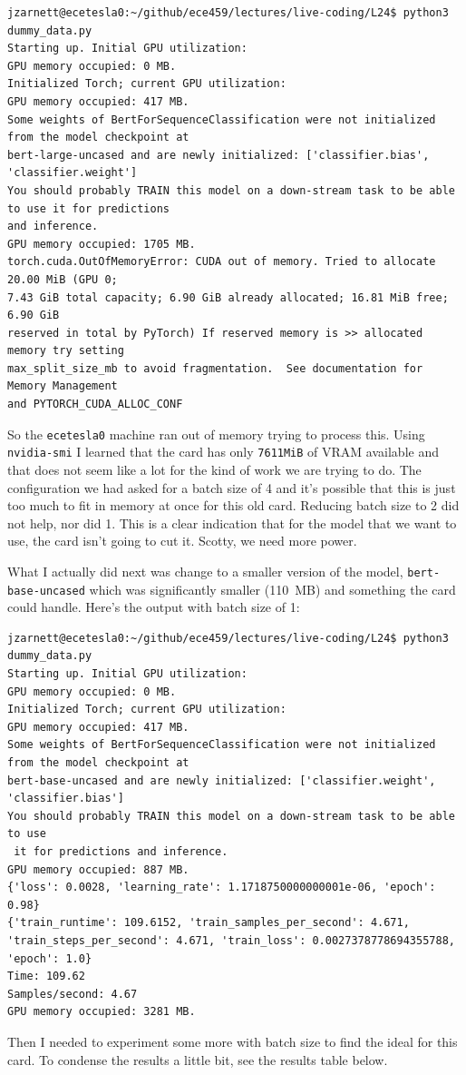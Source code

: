 \documentclass[a4paper]{report}
\begin{document}
{\small
\begin{verbatim}
jzarnett@ecetesla0:~/github/ece459/lectures/live-coding/L24$ python3 dummy_data.py 
Starting up. Initial GPU utilization:
GPU memory occupied: 0 MB.
Initialized Torch; current GPU utilization:
GPU memory occupied: 417 MB.
Some weights of BertForSequenceClassification were not initialized from the model checkpoint at 
bert-large-uncased and are newly initialized: ['classifier.bias', 'classifier.weight']
You should probably TRAIN this model on a down-stream task to be able to use it for predictions 
and inference.
GPU memory occupied: 1705 MB.
torch.cuda.OutOfMemoryError: CUDA out of memory. Tried to allocate 20.00 MiB (GPU 0; 
7.43 GiB total capacity; 6.90 GiB already allocated; 16.81 MiB free; 6.90 GiB 
reserved in total by PyTorch) If reserved memory is >> allocated memory try setting 
max_split_size_mb to avoid fragmentation.  See documentation for Memory Management
and PYTORCH_CUDA_ALLOC_CONF
\end{verbatim}
}

So the \texttt{ecetesla0} machine ran out of memory trying to process this. Using \texttt{nvidia-smi} I learned that the card has only \texttt{7611MiB} of VRAM available and that does not seem like a lot for the kind of work we are trying to do. The configuration we had asked for a batch size of 4 and it's possible that this is just too much to fit in memory at once for this old card. Reducing batch size to 2 did not help, nor did 1. This is a clear indication that for the model that we want to use, the card isn't going to cut it. Scotty, we need more power.

What I actually did next was change to a smaller version of the model, \texttt{bert-base-uncased} which was significantly smaller (110~MB) and something the card could handle. Here's the output with batch size of 1:

{\small
\begin{verbatim}
jzarnett@ecetesla0:~/github/ece459/lectures/live-coding/L24$ python3 dummy_data.py 
Starting up. Initial GPU utilization:
GPU memory occupied: 0 MB.
Initialized Torch; current GPU utilization:
GPU memory occupied: 417 MB.
Some weights of BertForSequenceClassification were not initialized from the model checkpoint at 
bert-base-uncased and are newly initialized: ['classifier.weight', 'classifier.bias']
You should probably TRAIN this model on a down-stream task to be able to use
 it for predictions and inference.
GPU memory occupied: 887 MB.
{'loss': 0.0028, 'learning_rate': 1.1718750000000001e-06, 'epoch': 0.98}
{'train_runtime': 109.6152, 'train_samples_per_second': 4.671, 
'train_steps_per_second': 4.671, 'train_loss': 0.0027378778694355788, 'epoch': 1.0}
Time: 109.62
Samples/second: 4.67
GPU memory occupied: 3281 MB.
\end{verbatim}
}
Then I needed to experiment some more with batch size to find the ideal for this card. To condense the results a little bit, see the results table below.
\end{document}
